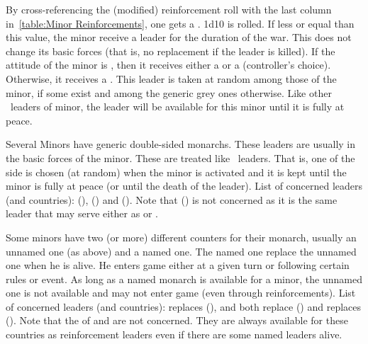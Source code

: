 \bparag By cross-referencing the (modified) reinforcement roll with the last
column in~\ref{table:Minor Reinforcements}, one gets a .
\bparag 1d10 is rolled. If less or equal than this value, the minor receive a
leader for the duration of the war. This does not change its basic forces
(that is, no replacement if the leader is killed).
\bparag If the attitude of the minor is , then it receives either
a \anonyme\LeaderA or a \anonyme\LeaderG (controller's choice). Otherwise, it
receives a \anonyme\LeaderG.
\bparag This leader is taken at random among those of the minor, if some exist
and among the generic grey ones otherwise.
\bparag Like other \anonyme\ leaders of minor, the leader will be available
for this minor until it is fully at peace.

\bparag Several Minors have generic double-sided monarchs. These leaders are
usually in the basic forces of the minor.
\bparag These are treated like \anonyme\ leaders. That is, one of the side is
chosen (at random) when the minor is activated and it is kept until the minor
is fully at peace (or until the death of the leader).
\bparag List of concerned leaders (and countries): 
(\paysMamelouks),  (\paysCrimee) and 
(\paysPerse).
\bparag Note that  (\paysChevaliers) is not concerned as
it is the same leader that may serve either as \LeaderG or \LeaderA.

\bparag Some minors have two (or more) different counters for their monarch,
usually an unnamed one (as above) and a named one.
\bparag The named one replace the unnamed one when he is alive. He enters game
either at a given turn or following certain rules or event.
\bparag As long as a named monarch is available for a minor, the unnamed one
is not available and may not enter game (even through reinforcements).
\bparag List of concerned leaders (and countries): 
replaces  (\paysChevaliers),  and
 both replace  (\paysPerse) and 
replaces  (\paysMogol).
\bparag Note that the \anonyme\LeaderG of \paysDanemark and \paysUSA are not
concerned. They are always available for these countries as reinforcement
leaders even if there are some named leaders alive.

